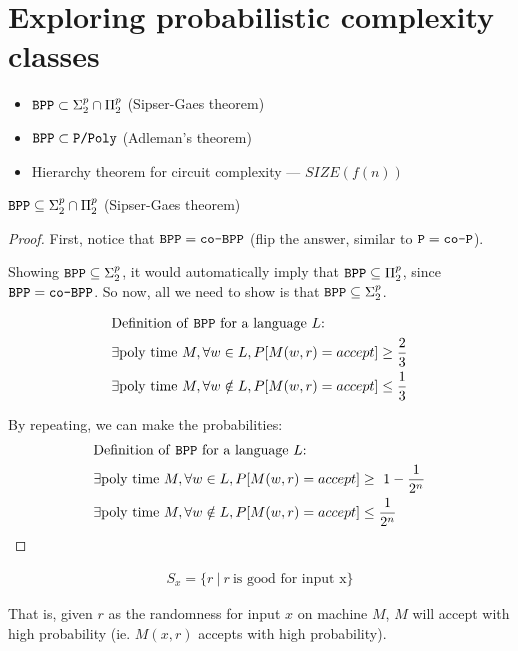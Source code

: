 \chapter{Exploring probabilistic complexity classes}

\begin{itemize}
    \item $\texttt{BPP} \subset \Sigma^p_2 \cap \Pi^p_2$ (Sipser-Gaes theorem)
    \item $\texttt{BPP} \subset \texttt{P/Poly}$ (Adleman's theorem)
    \item Hierarchy theorem for circuit complexity --- $SIZE(f(n))$
\end{itemize}


\begin{theorem}
    $\texttt{BPP} \subseteq \Sigma^p_2 \cap \Pi^p_2$ (Sipser-Gaes theorem)
\end{theorem}
\begin{proof}
    First, notice that $\texttt{BPP} = \texttt{co-BPP}$ (flip the answer, similar to $\texttt{P} = \texttt{co-P}$).

    Showing $\texttt{BPP} \subseteq \Sigma_2^p$, it would automatically imply that $\texttt{BPP} \subseteq \Pi_2^p$,
    since $\texttt{BPP} = \texttt{co-BPP}$.
    So now, all we need to show is that $\texttt{BPP} \subseteq \Sigma_2^p$.

    \begin{align*}
    &\text{Definition of \texttt{BPP}~for a language $L$:} \\
    &\exists \text{poly time}~M, \forall w \in L, P[M(w, r) = accept] \geq \frac{2}{3} \\
    &\exists \text{poly time}~M, \forall w \notin L, P[M(w, r) = accept] \leq \frac{1}{3}
    \end{align*}

    By repeating, we can make the probabilities:
    \begin{align*}
    &\text{Definition of \texttt{BPP}~for a language $L$:} \\
    &\exists \text{poly time}~M, \forall w \in L, P[M(w, r) = accept] \geq \ 1 - \frac{1}{2^n} \\
    &\exists \text{poly time}~M, \forall w \notin L, P[M(w, r) = accept] \leq \frac{1}{2^n}
    \end{align*}
\end{proof}

\begin{align*}
    S_x = \{ r~\vert~ r~\text{is good for input x} \}
\end{align*}

That is, given $r$ as the randomness for input $x$ on machine $M$, $M$ will
accept with high probability (ie. $M(x, r)$ accepts with high probability).


